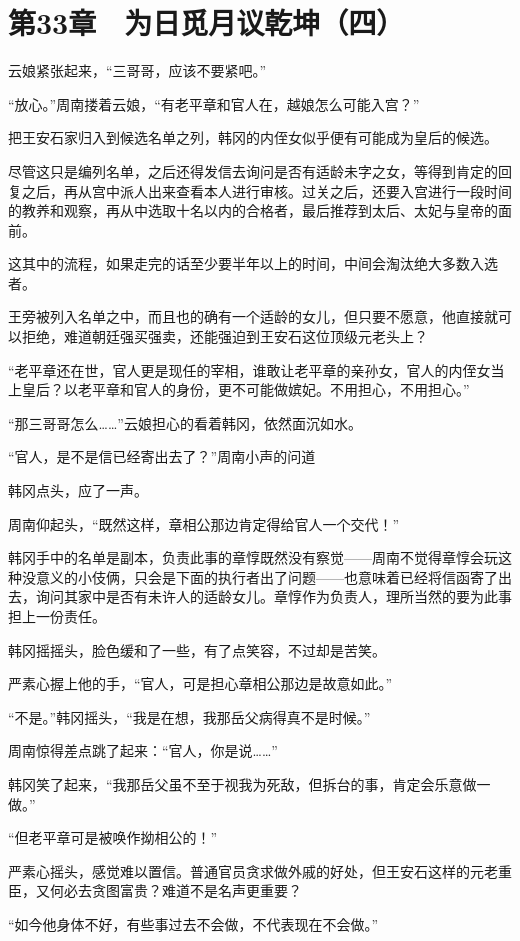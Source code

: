 \section{第33章　为日觅月议乾坤（四）}

云娘紧张起来，“三哥哥，应该不要紧吧。”

“放心。”周南搂着云娘，“有老平章和官人在，越娘怎么可能入宫？”

把王安石家归入到候选名单之列，韩冈的内侄女似乎便有可能成为皇后的候选。

尽管这只是编列名单，之后还得发信去询问是否有适龄未字之女，等得到肯定的回复之后，再从宫中派人出来查看本人进行审核。过关之后，还要入宫进行一段时间的教养和观察，再从中选取十名以内的合格者，最后推荐到太后、太妃与皇帝的面前。

这其中的流程，如果走完的话至少要半年以上的时间，中间会淘汰绝大多数入选者。

王旁被列入名单之中，而且也的确有一个适龄的女儿，但只要不愿意，他直接就可以拒绝，难道朝廷强买强卖，还能强迫到王安石这位顶级元老头上？

“老平章还在世，官人更是现任的宰相，谁敢让老平章的亲孙女，官人的内侄女当上皇后？以老平章和官人的身份，更不可能做嫔妃。不用担心，不用担心。”

“那三哥哥怎么……”云娘担心的看着韩冈，依然面沉如水。

“官人，是不是信已经寄出去了？”周南小声的问道

韩冈点头，应了一声。

周南仰起头，“既然这样，章相公那边肯定得给官人一个交代！”

韩冈手中的名单是副本，负责此事的章惇既然没有察觉——周南不觉得章惇会玩这种没意义的小伎俩，只会是下面的执行者出了问题——也意味着已经将信函寄了出去，询问其家中是否有未许人的适龄女儿。章惇作为负责人，理所当然的要为此事担上一份责任。

韩冈摇摇头，脸色缓和了一些，有了点笑容，不过却是苦笑。

严素心握上他的手，“官人，可是担心章相公那边是故意如此。”

“不是。”韩冈摇头，“我是在想，我那岳父病得真不是时候。”

周南惊得差点跳了起来：“官人，你是说……”

韩冈笑了起来，“我那岳父虽不至于视我为死敌，但拆台的事，肯定会乐意做一做。”

“但老平章可是被唤作拗相公的！”

严素心摇头，感觉难以置信。普通官员贪求做外戚的好处，但王安石这样的元老重臣，又何必去贪图富贵？难道不是名声更重要？

“如今他身体不好，有些事过去不会做，不代表现在不会做。”

